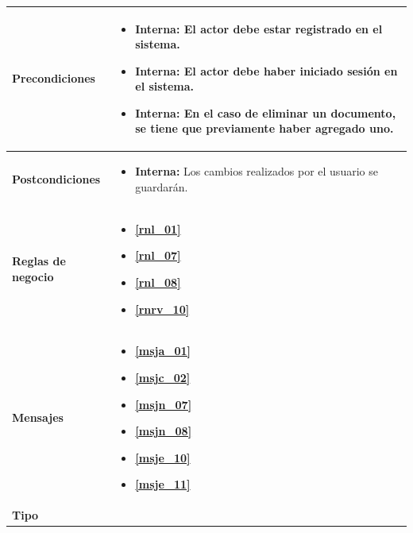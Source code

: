 \begin{center}
\begin{longtable}{| p{3.5cm} | p{11.5cm} |}
        \hline  
          \textbf{Precondiciones} &
		\begin{itemize}
	              \item \textbf{Interna:} El actor debe estar registrado en el sistema.
	              \item \textbf{Interna:} El actor debe haber iniciado sesión en el sistema.
	              \item \textbf{Interna:} En el caso de eliminar un documento, se tiene que previamente haber agregado uno.
	            \end{itemize} \\
        \hline  
          \textbf{Postcondiciones} & 
	\begin{itemize}
              \item \textbf{Interna:} Los cambios realizados por el usuario se guardarán.
	\end{itemize} \\
        \hline
          \textbf{Reglas de negocio} &    
  	  \begin{itemize}
  	    \item \textbf{\ref{rnl_01}}
  	    \item \textbf{\ref{rnl_07}}
  	    \item \textbf{\ref{rnl_08}}
  	    \item \textbf{\ref{rnrv_10}}
	  \end{itemize} \\
        \hline
          \textbf{Mensajes} &    
  	  \begin{itemize}
  	   \item \textbf{\ref{msja_01}}
  	    \item \textbf{\ref{msjc_02}}
  	    \item \textbf{\ref{msjn_07}}
  	    \item \textbf{\ref{msjn_08}}
  	    \item \textbf{\ref{msje_10}}
  	    \item \textbf{\ref{msje_11}}
	  \end{itemize} \\
        \hline
          \textbf{Tipo} & \\
        \hline      
  \end{longtable}
\end{center}
\endgroup

